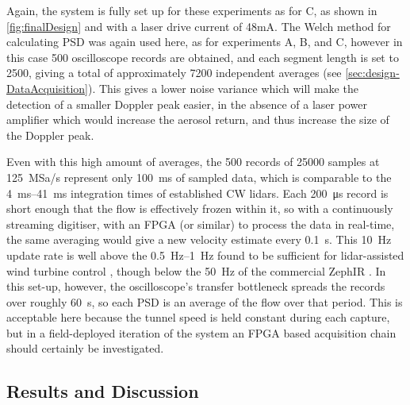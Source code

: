  Again, the system is fully set up for these experiments as for C, as shown in \autoref{fig:finalDesign} and with a laser drive current of 48mA. The Welch method for calculating PSD was again used here, as for experiments A, B, and C, however in this case 500 oscilloscope records are obtained, and each segment length is set to 2500, giving a total of approximately 7200 independent averages (see \autoref{sec:design-DataAcquisition}). This gives a lower noise variance which will make the detection of a smaller Doppler peak easier, in the absence of a laser power amplifier which would increase the aerosol return, and thus increase the size of the Doppler peak.
 
 Even with this high amount of averages, the 500 records of \num{25000} samples at \SI{125}{MSa/s} represent only \SI{100}{ms} of sampled data, which is comparable to the \SIrange{4}{41}{ms} integration times of established CW lidars\cite{hill_remote_nodate}\cite{bennett_doppler_2003}. Each \SI{200}{\micro s} record is short enough that the flow is effectively frozen within it, so with a continuously streaming digitiser, with an FPGA (or similar) to process the data in real-time, the same averaging would give a new velocity estimate every \SI{0.1}{s}. This \SI{10}{Hz} update rate is well above the \SIrange{0.5}{1}{Hz} found to be
 sufficient for lidar-assisted wind turbine control \cite{simley_optimizing_2018}, though below the \SI{50}{Hz} of the commercial ZephIR \cite{hill_remote_nodate}. In
 this set-up, however, the oscilloscope's transfer bottleneck spreads the records over roughly \SI{60}{s}, so each PSD is an average of the flow over that period. This is acceptable here because the tunnel speed is held constant during each capture, but in a field-deployed iteration of the system an FPGA based acquisition chain should certainly be investigated.

\subsection{Results and Discussion}

